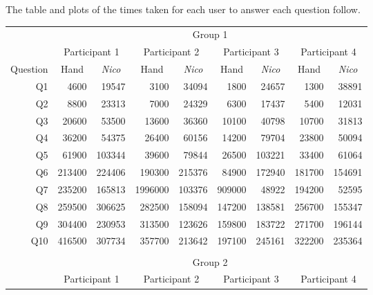 \documentclass[12pt,twoside,notitlepage,xetex]{report}
\begin{document}
The table and plots of the times taken for each user to answer each question follow.

\begin{center}
\begin{table}[H]
\begin{center}
\begin{tabular}{|r||r|r||r|r||r|r||r|r|}
\cline{2-9}
\multicolumn{1}{c|}{} & \multicolumn{8}{c|}{Group 1}\\ \cline{2-9}
\multicolumn{1}{c|}{} & \multicolumn{2}{c||}{Participant 1} & \multicolumn{2}{c||}{Participant 2} & \multicolumn{2}{c||}{Participant 3} & \multicolumn{2}{c|}{Participant 4}\\ \hline
\multicolumn{1}{|c||}{Question} & \multicolumn{1}{c|}{Hand} & \multicolumn{1}{c||}{\emph{Nico}} & \multicolumn{1}{c|}{Hand} & \multicolumn{1}{c||}{\emph{Nico}} & \multicolumn{1}{c|}{Hand} & \multicolumn{1}{c||}{\emph{Nico}} & \multicolumn{1}{c|}{Hand} & \multicolumn{1}{c|}{\emph{Nico}}\\ \hline \hline
Q1 & 4600 & 19547 & 3100 & 34094 & 1800 & 24657 & 1300 & 38891\\ \hline
Q2 & 8800 & 23313 & 7000 & 24329 & 6300 & 17437 & 5400 & 12031\\ \hline
Q3 & 20600 & 53500 & 13600 & 36360 & 10100 & 40798 & 10700 & 31813\\ \hline
Q4 & 36200 & 54375 & 26400 & 60156 & 14200 & 79704 & 23800 & 50094\\ \hline
Q5 & 61900 & 103344 & 39600 & 79844 & 26500 & 103221 & 33400 & 61064\\ \hline
Q6 & 213400 & 224406 & 190300 & 215376 & 84900 & 172940 & 181700 & 154691\\ \hline
Q7 & 235200 & 165813 & 1996000 & 103376 & 909000 & 48922 & 194200 & 52595\\ \hline
Q8 & 259500 & 306625 & 282500 & 158094 & 147200 & 138581 & 256700 & 155347\\ \hline
Q9 & 304400 & 230953 & 313500 & 123626 & 159800 & 183722 & 271700 & 196144\\ \hline
Q10 & 416500 & 307734 & 357700 & 213642 & 197100 & 245161 & 322200 & 235364\\ \hline
\multicolumn{9}{c}{}\\ \cline{2-9}
\multicolumn{1}{c|}{} & \multicolumn{8}{c|}{Group 2}\\ \cline{2-9}
\multicolumn{1}{c|}{} & \multicolumn{2}{c||}{Participant 1} & \multicolumn{2}{c||}{Participant 2} & \multicolumn{2}{c||}{Participant 3} & \multicolumn{2}{c|}{Participant 4}\\ \hline

\end{tabular}
\end{center}
\end{table}
\end{center}
\end{document}
